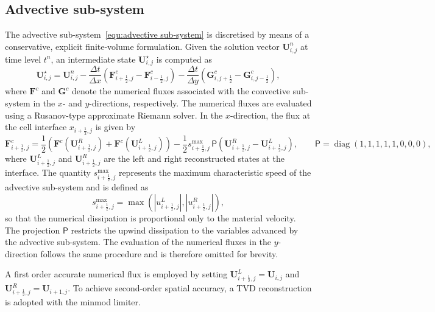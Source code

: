 \documentclass[a4paper,fleqn]{cas-sc}
\theoremstyle{definition}
\theoremstyle{remark}
\begin{document}
\subsection{Advective sub-system}
\label{sec:advective}
The advective sub-system~\eqref{equ:advective sub-system} is discretised by means of a conservative, explicit
finite-volume formulation. Given the solution vector $\mathbf{U}_{i,j}^n$ at time
level $t^n$, an intermediate state $\mathbf{U}_{i,j}^\star$ is computed as
\begin{equation}
\mathbf{U}_{i,j}^\star
=
\mathbf{U}_{i,j}^n
-
\frac{\Delta t}{\Delta x}
\left(
\mathbf{F}^c_{i+\frac12,j}
-
\mathbf{F}^c_{i-\frac12,j}
\right)
-
\frac{\Delta t}{\Delta y}
\left(
\mathbf{G}^c_{i,j+\frac12}
-
\mathbf{G}^c_{i,j-\frac12}
\right),
\label{eq:advective_update}
\end{equation}
where $\mathbf{F}^c$ and $\mathbf{G}^c$ denote the numerical fluxes associated with
the convective sub-system in the $x$- and $y$-directions, respectively.
The numerical fluxes are evaluated using a Rusanov-type
approximate Riemann solver. In the $x$-direction, the flux at the cell interface
$x_{i+\frac12,j}$ is given by
\begin{equation}
\mathbf{F}^c_{i+\frac12,j}
=
\frac12
\left(
\mathbf{F}^c(\mathbf{U}^R_{i+\frac12,j})
+
\mathbf{F}^c(\mathbf{U}^L_{i+\frac12,j})
\right)
-
\frac12
s^{\max}_{i+\frac12,j}\,
\mathsf{P}
\left(
\mathbf{U}^R_{i+\frac12,j}
-
\mathbf{U}^L_{i+\frac12,j}
\right),
\qquad
\mathsf{P} = \operatorname{diag}(1,1,1,1,1,0,0,0),
\label{eq:rusanov_flux}
\end{equation}
where $\mathbf{U}^L_{i+\frac12,j}$ and $\mathbf{U}^R_{i+\frac12,j}$ are the left and
right reconstructed states at the interface. The quantity
$s^{\max}_{i+\frac12,j}$ represents the maximum characteristic speed of the
advective sub-system and is defined as
\begin{equation}
s^{\max}_{i+\frac12,j}
=
\max\!\left(
\left|u^L_{i+\frac12,j}\right|,
\left|u^R_{i+\frac12,j}\right|
\right),
\end{equation}
so that the numerical dissipation is proportional only to the material velocity.
The projection $\mathsf{P}$ restricts the upwind dissipation to the variables
advanced by the advective sub-system. 
The evaluation of the numerical
fluxes in the $y$-direction follows the same procedure and is therefore omitted for
brevity.

A first order accurate numerical flux is employed by
setting
$\mathbf{U}^L_{i+\frac12,j} = \mathbf{U}_{i,j}$ and
$\mathbf{U}^R_{i+\frac12,j} = \mathbf{U}_{i+1,j}$.
To achieve second-order spatial accuracy, a TVD reconstruction is adopted with the minmod limiter.
\end{document}
